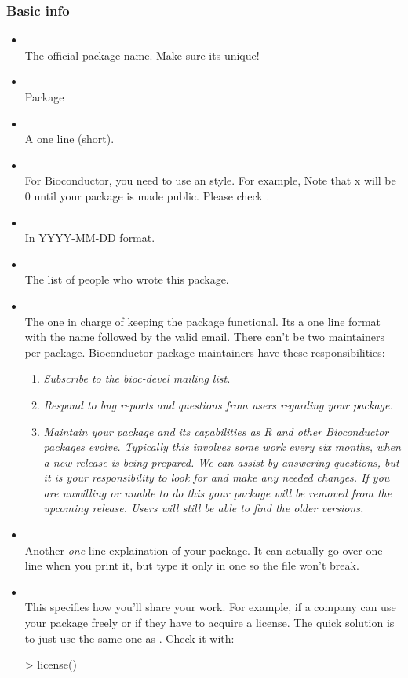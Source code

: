 \begin{frame}
  \frametitle{Basic info}
  \begin{itemize}
  \item {} \\ The official package name. Make sure its unique!
  \item {} \\ Package
  \item {} \\ A one line (\alert{short}).
  \item {} \\ For Bioconductor, you need to use an  style. For example,  Note that x will be 0 until your package is made public. Please check .
  \item {} \\ In YYYY-MM-DD format.
  \item {} \\ The list of people who wrote this package.
  \item {} \\ The one in charge of keeping the package functional. Its a one line format with the name followed by the \alert{valid} email. There can't be two maintainers per package. Bioconductor package maintainers have these responsibilities:
  \begin{enumerate}
  \item \emph{Subscribe to the bioc-devel mailing list.}
  \item \emph{Respond to bug reports and questions from users regarding your package.}
  \item \emph{Maintain your package and its capabilities as R and other Bioconductor packages evolve. Typically this involves some work every six months, when a new release is being prepared. We can assist by answering questions, but it is your responsibility to look for and make any needed changes. If you are unwilling or unable to do this your package will be removed from the upcoming release. Users will still be able to find the older versions.}
  \end{enumerate}
  \item {} \\ Another \emph{one} line explaination of your package. It can actually go over one line when you print it, but type it only in one so the  file won't break.
  \item {} \\ This specifies how you'll share your work. For example, if a company can use your package freely or if they have to acquire a license. The quick solution is to just use the same one as . Check it with:
\begin{Schunk}
\begin{Sinput}
> license()
\end{Sinput}
\end{Schunk}
  \end{itemize}
\end{frame}

